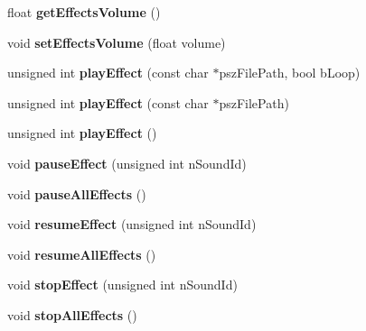 \begin{DoxyCompactItemize}
float {\bfseries get\+Effects\+Volume} ()
\item 
\mbox{\label{classcocostudio_1_1ComAudio_ac9b908738eb2cd5f83ba706059dddcfa}} 
void {\bfseries set\+Effects\+Volume} (float volume)
\item 
\mbox{\label{classcocostudio_1_1ComAudio_a93132ee12cf70056221074e237b55340}} 
unsigned int {\bfseries play\+Effect} (const char $\ast$psz\+File\+Path, bool b\+Loop)
\item 
\mbox{\label{classcocostudio_1_1ComAudio_a33a37dc6b86a880e34b61a1ee43255c0}} 
unsigned int {\bfseries play\+Effect} (const char $\ast$psz\+File\+Path)
\item 
\mbox{\label{classcocostudio_1_1ComAudio_a9b59df93194c2ee099b134207b8ac2a6}} 
unsigned int {\bfseries play\+Effect} ()
\item 
\mbox{\label{classcocostudio_1_1ComAudio_a08484065296ea5e64c0991c3f5b334ba}} 
void {\bfseries pause\+Effect} (unsigned int n\+Sound\+Id)
\item 
\mbox{\label{classcocostudio_1_1ComAudio_a1fd4251fc7e25cb99c26739a2fdeee40}} 
void {\bfseries pause\+All\+Effects} ()
\item 
\mbox{\label{classcocostudio_1_1ComAudio_aa19270bf8f4180f619c9a7f01a1f71b0}} 
void {\bfseries resume\+Effect} (unsigned int n\+Sound\+Id)
\item 
\mbox{\label{classcocostudio_1_1ComAudio_a83b1ec61c6bb526167967b1436aefd76}} 
void {\bfseries resume\+All\+Effects} ()
\item 
\mbox{\label{classcocostudio_1_1ComAudio_ad56181c41bc984689839b5640a8162ca}} 
void {\bfseries stop\+Effect} (unsigned int n\+Sound\+Id)
\item 
\mbox{\label{classcocostudio_1_1ComAudio_a05607a6b2cdeeca00b91754c4b672c50}} 
void {\bfseries stop\+All\+Effects} ()
\item 

\end{DoxyCompactItemize}
